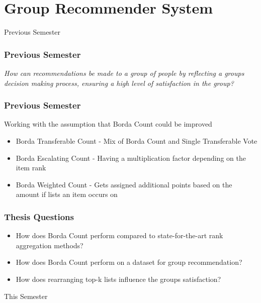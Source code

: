 \section{Group Recommender System}
\begin{frame}
     \begin{center}
     	\huge Previous Semester
     \end{center}
\end{frame}

\begin{frame}
\frametitle{Previous Semester}
\textit{How can recommendations be made to a group of people by reflecting a groups decision making process, ensuring a high level of satisfaction in the group?}
\end{frame}

\begin{frame}
\frametitle{Previous Semester}
Working with the assumption that Borda Count could be improved

\begin{itemize}
\item Borda Transferable Count - Mix of Borda Count and Single Transferable Vote
\item Borda Escalating Count - Having a multiplication factor depending on the item rank
\item Borda Weighted Count - Gets assigned additional points based on the amount if lists an item occurs on
\end{itemize}
\end{frame}

\begin{frame}
\frametitle{Thesis Questions}
\begin{itemize}
\item How does Borda Count perform compared to state-for-the-art rank aggregation methods?
\item How does Borda Count perform on a dataset for group recommendation?
\item How does rearranging top-k lists influence the groups satisfaction?
\end{itemize}
\end{frame}

\begin{frame}
     \begin{center}
     	\huge This Semester
     \end{center}
\end{frame}

